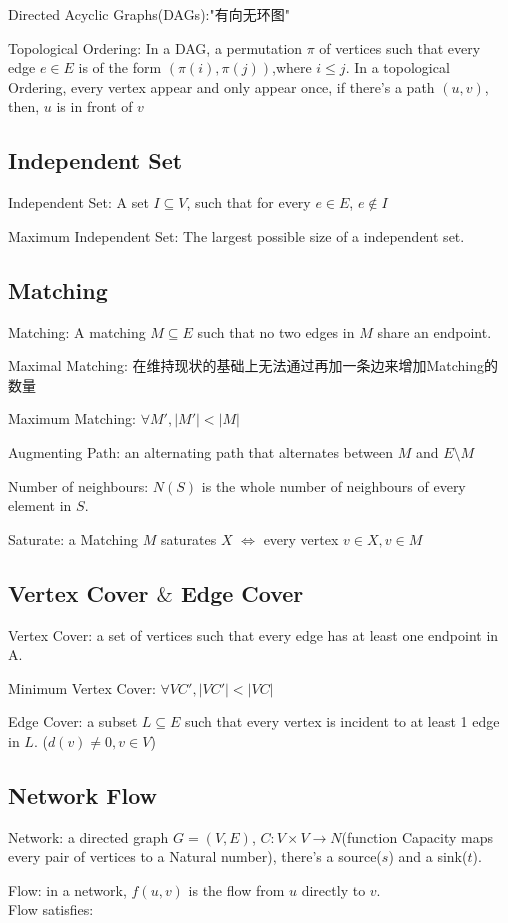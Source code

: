 \documentclass[12pt,a4paper]{ctexrep}
\begin{document}
Directed Acyclic Graphs(DAGs):"有向无环图"

Topological Ordering: In a DAG, a permutation $\pi$ of vertices such that every edge $e\in E$ is of the form $(\pi(i),\pi(j))$,where $i\leq j$. In a topological Ordering, every vertex appear and only appear once, if there's a path $(u,v)$, then, $u$ is in front of $v$
\subsection{Independent Set}
Independent Set: A set $I\subseteq V$, such that for every $e \in E$, $e\notin I$

Maximum Independent Set: The largest possible size of a independent set.
\subsection{Matching}
Matching: A matching $M\subseteq E$ such that no two edges in $M$ share an endpoint.

Maximal Matching: 在维持现状的基础上无法通过再加一条边来增加Matching的数量

Maximum Matching: $\forall M', |M'|<|M|$

Augmenting Path: an alternating path that alternates between $M$ and $E\setminus M$

Number of neighbours: $N(S)$ is the whole number of neighbours of every element in $S$.

Saturate: a Matching $M$ saturates $X$ $\iff$ every vertex $v \in X, v \in M$
\subsection{Vertex Cover $\&$ Edge Cover}
Vertex Cover: a set of vertices such that every edge has at least one endpoint in A.

Minimum Vertex Cover: $\forall VC', |VC'|<|VC|$

Edge Cover: a subset $L\subseteq E$ such that every vertex is incident to at least 1 edge in $L$. ($d(v)\neq 0,v \in V$)
\subsection{Network Flow}
Network: a directed graph $G=(V,E)$, $C:V\times V \rightarrow N$(function Capacity maps every pair of vertices to a Natural number), there's a source($s$) and a sink($t$).

Flow: in a network, $f(u,v)$ is the flow from $u$ directly to $v$. \\
Flow satisfies: 
\end{document}
